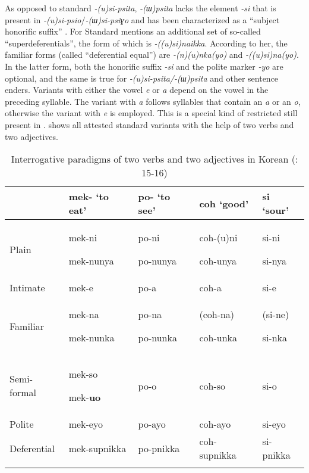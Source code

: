 As opposed to standard  \textit{-(u)si-psita},   \textit{-(ɯ)psita} lacks the element \textit{-si} that is present in \textit{-(u)si-psio}/\textit{-(ɯ)si-psiɣo} and has been characterized as a “subject honorific suffix” \citep[344]{Sohn1994}. For Standard  \citet[151]{Kim-Renaud2012} mentions an additional set of so-called “superdeferentials”, the  form of which is \textit{-((u)si)naikka}. According to her, the familiar  forms (called “deferential equal”) are \textit{-(n)(u)nka(yo)} and \textit{-((u)si)na(yo)}. In the latter form, both the honorific suffix \textit{-si} and the polite marker \textit{-yo} are optional, and the same is true for \textit{-(u)si-psita/-(ɯ)psita} and other sentence enders. Variants with either the vowel \textit{e} or \textit{a} depend on the vowel in the preceding syllable. The variant with \textit{a} follows syllables that contain an \textit{a} or an \textit{o}, otherwise the variant with \textit{e} is employed. This is a special kind of restricted  still present in .  shows all attested standard  variants with the help of two verbs and two adjectives.

\begin{table}
\caption{Interrogative paradigms of two verbs and two adjectives in Korean (\citealt{Sohn1994}: 15-16)}
\label{tab:kore:3}

\begin{tabularx}{\textwidth}{XXXXl}
\lsptoprule
& \textbf{mek- ‘to eat’} & \textbf{po- ‘to see’} & \textbf{coh ‘good’} & \textbf{si ‘sour’}\\
\midrule
Plain & mek-ni

mek-nunya & po-ni

po-nunya & coh-(u)ni

coh-unya & si-ni

si-nya\\
Intimate & mek-e & po-a & coh-a & si-e\\
Familiar & mek-na

mek-nunka & po-na

po-nunka & (coh-na)

coh-unka & (si-ne)

si-nka\\
Semi-formal & mek-so

mek-\textbf{uo} & po-o & coh-so & si-o\\
Polite & mek-eyo & po-ayo & coh-ayo & si-eyo\\
Deferential & mek-supnikka & po-pnikka & coh-supnikka & si-pnikka\\
\lspbottomrule
\end{tabularx}
\end{table}

